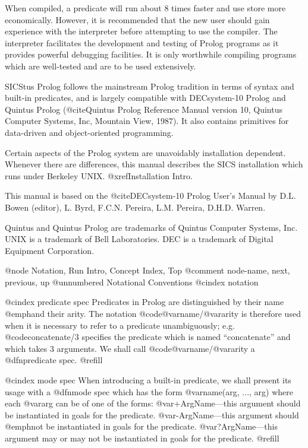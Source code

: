 When compiled, a predicate will run about 8 times faster and use store
more economically.  However, it is recommended that the new user should
gain experience with the interpreter before attempting to use the compiler.
The interpreter facilitates the development and testing of Prolog programs
as it provides powerful debugging facilities.  It is only worthwhile
compiling programs which are well-tested and are to be used extensively.

SICStus Prolog follows the mainstream Prolog tradition in terms of
syntax and built-in predicates, and is largely compatible with
DECsystem-10 Prolog and Quintus Prolog (@cite{Quintus Prolog Reference
Manual version 10}, Quintus Computer Systems, Inc, Mountain View, 1987).
It also contains primitives for data-driven and object-oriented
programming.

Certain aspects of the Prolog system are unavoidably installation
dependent.  Whenever there are differences, this manual describes the SICS
installation which runs under Berkeley UNIX. @xref{Installation Intro}.

This manual is based on the @cite{DECsystem-10 Prolog User's Manual} by
D.L. Bowen (editor), L. Byrd, F.C.N. Pereira, L.M. Pereira, D.H.D. Warren.

Quintus and Quintus Prolog are trademarks of Quintus Computer Systems,
Inc.  UNIX is a trademark of Bell Laboratories.  DEC is a trademark of
Digital Equipment Corporation.

@node Notation, Run Intro, Concept Index, Top
@comment  node-name,  next,  previous,  up
@unnumbered Notational Conventions
@cindex notation

@cindex predicate spec
Predicates in Prolog are distinguished by their name @emph{and} their
arity.  The notation @code{@var{name}/@var{arity}} is therefore used
when it is necessary to refer to a predicate unambiguously; e.g.
@code{concatenate/3} specifies the predicate which is named
``concatenate'' and which takes 3 arguments.  We shall call
@code{@var{name}/@var{arity}} a @dfn{predicate spec}. @refill

@cindex mode spec
When introducing a built-in predicate, we shall present its usage with a
@dfn{mode spec} which has the form @var{name(arg, ..., arg)} where each
@var{arg} can be of one of the forms: @var{+ArgName}---this argument
should be instantiated in goals for the predicate. @var{-ArgName}---this
argument should @emph{not} be instantiated in goals for the predicate.
@var{?ArgName}---this argument may or may not be instantiated in goals
for the predicate. @refill

